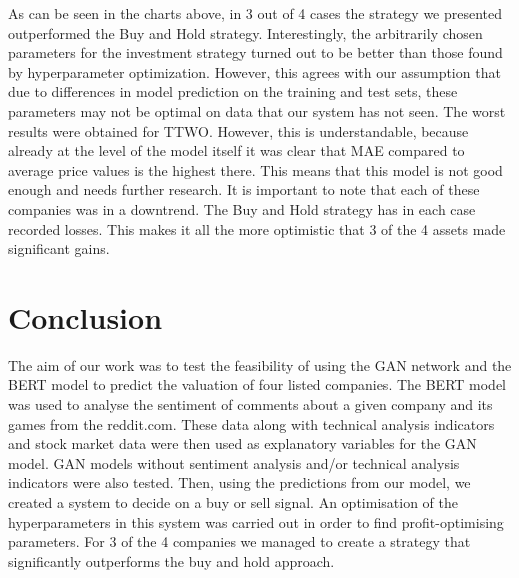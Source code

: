 \documentclass[11pt]{article} %
\begin{document}
\begin{figure}[H]
\begin{adjustbox}{width=1.3\textwidth,center}

\end{adjustbox}
\end{figure}

\begin{figure}[H]
\begin{adjustbox}{width=1.3\textwidth,center}

\end{adjustbox}
\end{figure}

\begin{figure}[H]
\begin{adjustbox}{width=1.3\textwidth,center}

\end{adjustbox}
\end{figure}


 As can be seen in the charts above, in 3 out of 4 cases the strategy we presented outperformed the Buy and Hold strategy. Interestingly, the arbitrarily chosen parameters for the investment strategy turned out to be better than those found by hyperparameter optimization. However, this agrees with our assumption that due to differences in model prediction on the training and test sets, these parameters may not be optimal on data that our system has not seen. The worst results were obtained for TTWO. However, this is understandable, because already at the level of the model itself it was clear that MAE compared to average price values is the highest there. This means that this model is not good enough and needs further research. It is important to note that each of these companies was in a downtrend. The Buy and Hold strategy has in each case recorded losses. This makes it all the more optimistic that 3 of the 4 assets made significant gains. 

\section{Conclusion}

The aim of our work was to test the feasibility of using the GAN network and the BERT model to predict the valuation of four listed companies. The BERT model was used to analyse the sentiment of comments about a given company and its games from the reddit.com. These data along with technical analysis indicators and stock market data were then used as explanatory variables for the GAN model. GAN models without sentiment analysis and/or technical analysis indicators were also tested. Then, using the predictions from our model, we created a system to decide on a buy or sell signal. An optimisation of the hyperparameters in this system was carried out in order to find profit-optimising parameters. For 3 of the 4 companies we managed to create a strategy that significantly outperforms the buy and hold approach. \\
\end{document}
